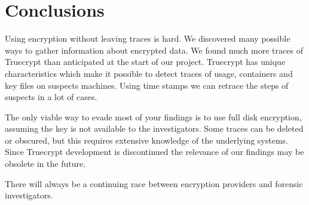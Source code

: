 \section{Conclusions}

Using encryption without leaving traces is hard. We discovered many possible ways to gather information about encrypted data. We found much more traces of Truecrypt than anticipated at the start of our project. Truecrypt has unique characteristics which make it possible to detect traces of usage, containers and key files on suspects machines. 
Using time stamps we can retrace the steps of suspects in a lot of cases.

The only viable way to evade most of your findings is to use full disk encryption, assuming the key is not available to the investigators. Some traces can be deleted or obscured, but this requires extensive knowledge of the underlying systems.
Since Truecrypt development is discontinued the relevance of our findings may be obsolete in the future. 

There will always be a continuing race between encryption providers and forensic investigators.